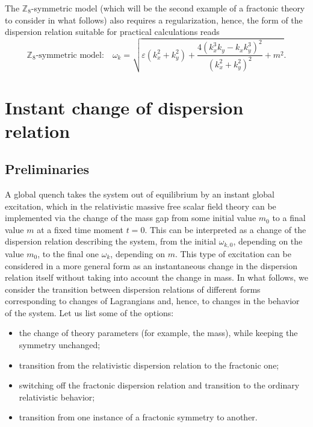 \documentclass[a4paper,12pt]{article}
\newcommand{\be}{\begin{equation}}
\newcommand{\ee}{\end{equation}}
\newcommand{\eps}{\varepsilon}
\newcommand{\om}{\omega}
\newcommand{\Z}[1]{\mathbb{Z}_{#1}}
\begin{document}
The $\Z8$-symmetric model (which will be the second example of a fractonic theory to consider in what follows) also requires a regularization, hence, the form of the dispersion relation suitable for practical calculations reads
\be
    \Z8\text{-symmetric model:} \quad \omega_k = \sqrt{\eps(k_x^2 + k_y^2) + \frac{4(k_x^3 k_y - k_x k_y^3)^2}{(k_x^2 + k_y^2)^2} + m^2}.
    \label{eq:Z8disprel}
\ee

\section{Instant change of dispersion relation}
\label{sec:mass-quench}

\subsection*{Preliminaries}

A global quench takes the system out of equilibrium by an instant global excitation, which in the relativistic massive free scalar field theory can be implemented via the change of the mass gap from some initial value $m_0$ to a final value $m$ at a fixed time moment $t = 0$. This can be interpreted as a change of the dispersion relation describing the system, from the initial $\om_{k,0}$, depending on the value $m_0$, to the final one $\om_k$, depending on $m$. This type of excitation can be considered in a more general form as an instantaneous change in the dispersion relation itself without taking into account the change in mass. In what follows, we consider the transition between dispersion relations of different forms corresponding to changes of Lagrangians and, hence, to changes in the behavior of the system. Let us list some of the options:
\begin{itemize}
    \item the change of theory parameters (for example, the mass), while keeping the symmetry unchanged;
    \item transition from the relativistic dispersion relation to the fractonic one;
    \item switching off the fractonic dispersion relation and transition to the ordinary relativistic behavior;
    \item transition from one instance of a fractonic symmetry to another.
\end{itemize}
\end{document}
